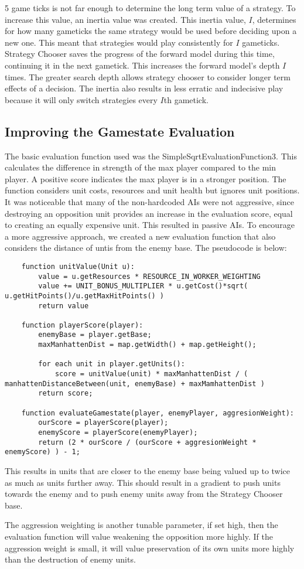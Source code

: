 \documentclass[]{article}
\begin{document}
5 game ticks is not far enough to determine the long term value of a strategy. To increase this value, an inertia value was created. This inertia value, $I$, determines for how many gameticks the same strategy would be used before deciding upon a new one. This meant that strategies would play consistently for $I$ gameticks. Strategy Chooser saves the progress of the forward model during this time, continuing it in the next gametick. This increases the forward model's depth $I$ times. The greater search depth allows strategy chooser to consider longer term effects of a decision. The inertia also results in less erratic and indecisive play because it will only switch strategies every $I$th gametick. 

\subsection{Improving the Gamestate Evaluation}
The basic evaluation function used was the SimpleSqrtEvaluationFunction3. This calculates the difference in  strength of the max player compared to the min player. A positive score indicates the max player is in a stronger position. The function considers unit costs, resources and unit health but ignores unit positions. It was noticeable that many of the non-hardcoded AIs were not aggressive, since destroying an opposition unit provides an increase in the evaluation score, equal to creating an equally expensive unit. This resulted in passive AIs. To encourage a more aggressive approach, we created a new evaluation function that also considers the distance of untis from the enemy base. The pseudocode is below:
\begin{lstlisting}
	function unitValue(Unit u):
		value = u.getResources * RESOURCE_IN_WORKER_WEIGHTING
		value += UNIT_BONUS_MULTIPLIER * u.getCost()*sqrt( u.getHitPoints()/u.getMaxHitPoints() )
		return value
		
	function playerScore(player):
		enemyBase = player.getBase;
		maxManhattenDist = map.getWidth() + map.getHeight();
		
		for each unit in player.getUnits():
			score = unitValue(unit) * maxManhattenDist / ( manhattenDistanceBetween(unit, enemyBase) + maxMamhattenDist ) 
		return score;
	
	function evaluateGamestate(player, enemyPlayer, aggresionWeight):
		ourScore = playerScore(player);
		enemyScore = playerScore(enemyPlayer);
		return (2 * ourScore / (ourScore + aggresionWeight * enemyScore) ) - 1;
\end{lstlisting}
This results in units that are closer to the enemy base being valued up to twice as much as units further away. This should result in a gradient to push units towards the enemy and to push enemy units away from the Strategy Chooser base. 

The aggression weighting is another tunable parameter, if set high, then the evaluation function will value weakening the opposition more highly. If the aggression weight is small, it will value preservation of its own units more highly than the destruction of enemy units. 



\end{document}
